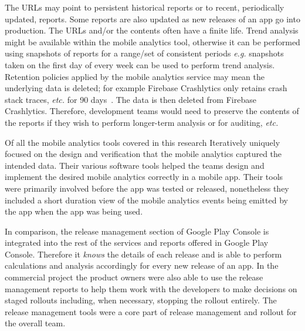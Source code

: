 The URLs may point to persistent historical reports or to recent, periodically updated, reports. Some reports are also updated as new releases of an app go into production. The URLs and/or the contents often have a finite life. Trend analysis might be available within the mobile analytics tool, otherwise it can be performed using snapshots of reports for a range/set of consistent periods \emph{e.g.} snapshots taken on the first day of every week can be used to perform trend analysis. Retention policies applied by the mobile analytics service may mean the underlying data is deleted; for example Firebase Crashlytics only retains crash stack traces, \emph{etc.} for 90 days~\citep{firebasesupport2022_crashlytics_data_retention_policy}. The data is then deleted from Firebase Crashlytics. Therefore, development teams would need to preserve the contents of the reports if they wish to perform longer-term analysis or for auditing, \emph{etc.}

Of all the mobile analytics tools covered in this research Iteratively uniquely focused on the design and verification that the mobile analytics captured the intended data. Their various software tools helped the teams design and implement the desired mobile analytics correctly in a mobile app. Their tools were primarily involved before the app was tested or released, nonetheless they included a short duration view of the mobile analytics events being emitted by the app when the app was being used.

In comparison, the release management section of Google Play Console is integrated into the rest of the services and reports offered in Google Play Console. Therefore it \emph{knows} the details of each release and is able to perform calculations and analysis accordingly for every new release of an app. In the commercial project the product owners were also able to use the release management reports to help them work with the developers to make decisions on staged rollouts including, when necessary, stopping the rollout entirely. The release management tools were a core part of release management and rollout for the overall team. %

